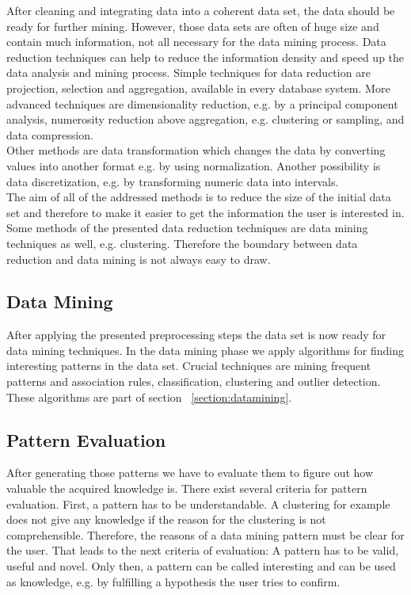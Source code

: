 After cleaning and integrating data into a coherent data set, the data should be ready for further mining. However, those data sets are often of huge size and contain much information, not all necessary for the data mining process. Data reduction techniques can help to reduce the information density and speed up the data analysis and mining process. Simple techniques for data reduction are projection, selection and aggregation, available in every database system. More advanced techniques are dimensionality reduction, e.g. by a principal component analysis, numerosity reduction above aggregation, e.g. clustering or sampling, and data compression. 
\\
Other methods are data transformation which changes the data by converting values into another format e.g. by using normalization. Another possibility is data discretization, e.g. by transforming numeric data into intervals. 
\\
The aim of all of the addressed methods is to reduce the size of the initial data set and therefore to make it easier to get the information the user is interested in. Some methods of the presented data reduction techniques are data mining techniques as well, e.g. clustering. Therefore the boundary between data reduction and data mining is not always easy to draw.


\subsection{Data Mining}

After applying the presented preprocessing steps the data set is now ready for data mining techniques. In the data mining phase we apply algorithms for finding interesting patterns in the data set. Crucial techniques are mining frequent patterns and association rules, classification, clustering and outlier detection. These algorithms are part of section ~\ref{section:datamining}. 


\subsection{Pattern Evaluation}

After generating those patterns we have to evaluate them to figure out how valuable the acquired knowledge is. There exist several criteria for pattern evaluation. First, a pattern has to be understandable. A clustering for example does not give any knowledge if the reason for the clustering is not comprehensible. Therefore, the reasons of a data mining pattern must be clear for the user. That leads to the next criteria of evaluation: A pattern has to be valid, useful and novel. Only then, a pattern can be called interesting and can be used as knowledge, e.g. by fulfilling a hypothesis the user tries to confirm. 


